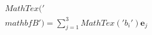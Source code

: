 \documentclass[preview]{standalone}
\begin{document}
\begin{align*}
MathTex('\\mathbf{B}') = \sum_{j=1}^3 MathTex('b_i') \mathbf{e}_j
\end{align*}
\end{document}
